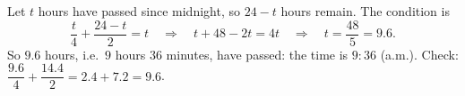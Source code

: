 Let $t$ hours have passed since midnight, so $24-t$ hours remain. The condition is
\[
\dfrac {t}{4}+\dfrac{24-t}{2}=t\quad\Longrightarrow\quad t+48-2t=4t\quad\Longrightarrow\quad t=\dfrac{48}{5}=9.6 .
\]
So $9.6$ hours, i.e.\ $9$ hours $36$ minutes, have passed: the time is $\boxed{9{:}36}$ (a.m.). Check: $\dfrac{9.6}{4}+\dfrac{14.4}{2}=2.4+7.2=9.6$.
